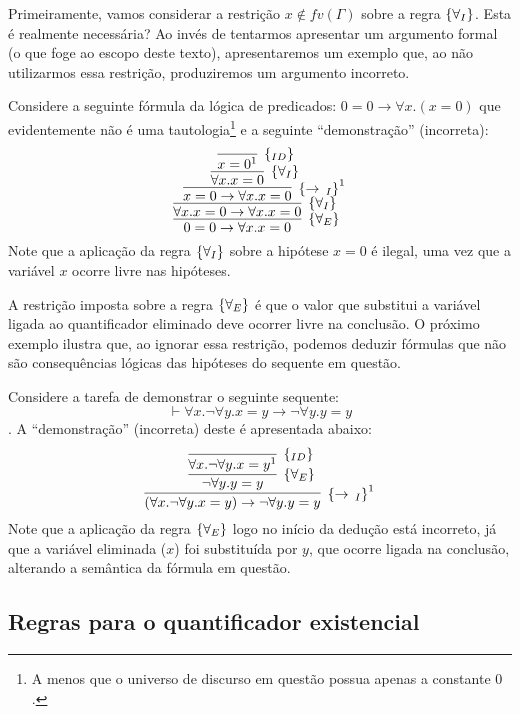 Primeiramente, vamos considerar a restrição $x \not\in fv(\Gamma)$
sobre a regra $\scriptsize{\{\forall_I}\}$. Esta é realmente necessária? Ao
invés de tentarmos apresentar um argumento formal (o que foge ao
escopo deste texto), apresentaremos um exemplo que, ao não utilizarmos
essa restrição, produziremos um argumento incorreto.
\begin{Example}
Considere a seguinte fórmula da lógica de predicados:
$0= 0 \to \forall x. (x = 0)$
que evidentemente não é uma tautologia\footnote{A menos que o universo de
discurso em questão possua apenas a constante $0$.} e a seguinte
``demonstração'' (incorreta):
\[
\infer[\forallE]{0 = 0 \to \forall x . x = 0}
         {
           \infer[\forallI]{\forall x. x = 0 \to \forall x. x = 0}
                     {
                       \infer[\impI^1]{x = 0 \to \forall x. x = 0}
                                {
                                  \infer[\forallI]{\forall x. x = 0}
                                           {
                                             \infer[\Id]{x = 0^1}{}
                                           }
                                }
                     }
         }
\]
Note que a aplicação da regra $\scriptsize{\{\forall_I}\}$ sobre a hipótese $x= 0$ é
ilegal, uma vez que a variável $x$ ocorre livre nas hipóteses.
\end{Example}

A restrição imposta sobre a regra $\scriptsize{\{\forall_E}\}$ é que o valor que
substitui a variável ligada ao quantificador eliminado deve ocorrer
livre na conclusão. O próximo exemplo ilustra que, ao ignorar essa
restrição, podemos deduzir fórmulas que não são consequências lógicas
das hipóteses do sequente em questão.
\begin{Example}
Considere a tarefa de demonstrar o seguinte sequente: \[\vdash \forall
x.\neg\forall y. x = y \to \neg \forall y. y = y\]. A ``demonstração'' (incorreta)
deste é apresentada abaixo:
\[
\infer[\impI^1]{(\forall x.\neg\forall y. x = y) \to \neg \forall y . y
= y}
        {
          \infer[\forallE]{\neg \forall y. y = y}
                   {
                     \infer[\Id]{\forall x.\neg\forall y. x = y^1}{}
                   }
        }
\]
Note que a aplicação da regra $\scriptsize{\{\forall_E}\}$ logo no início da dedução
está incorreto, já que a variável eliminada ($x$) foi substituída por
$y$, que ocorre ligada na conclusão, alterando a semântica da
fórmula em questão.
\end{Example}

\subsection{Regras para o quantificador existencial}

